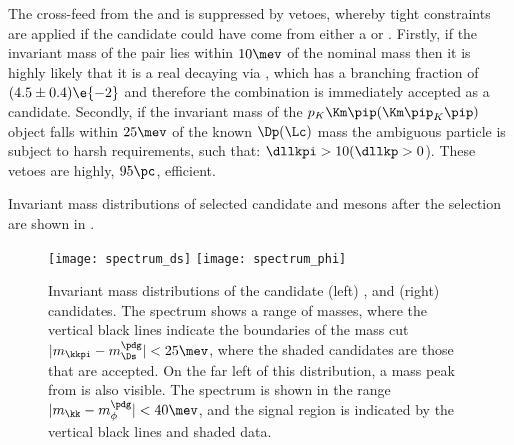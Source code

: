 The cross-feed from the \Dp and \Lc is suppressed by vetoes, whereby tight \pid constraints are
applied if the \dstokkpi candidate could have come from either a \Dp or \Lc.
Firstly, if the invariant mass of the \kk pair lies within $10\mev$ of the nominal \phii mass
then it is highly likely that it is a real \Ds decaying via \decay{\Ds}{\phi\pip}, which has a
branching fraction of $(4.5\pm0.4)\e{-2}$ and therefore the \kkpi combination is immediately
accepted as a \Ds candidate.
Secondly, if the invariant mass of the $p_K\Km\pip(\Km\pip_K\pip)$ object falls within $25\mev$ of
the known $\Dp(\Lc)$ mass the ambiguous particle is subject to harsh \pid requirements, such that:
$\dllkpi>10(\dllkp>0$).
These vetoes are highly, \approx$95\pc$, efficient.






Invariant mass distributions of
selected candidate \Ds and \phii mesons after the selection are shown in .

\begin{figure}
  \begin{center}
    \texttt{[image: spectrum\_ds]}
    \texttt{[image: spectrum\_phi]}
    \caption[Selected \Ds and \phii candidates]
    {
      Invariant mass distributions of the candidate
      (left) \decay{\Ds}{\kkpi}, and
      (right) \decay{\phii}{\kk} candidates.
      The \kkpi spectrum shows a range of masses, where the vertical black lines indicate the
      boundaries of the mass cut $|m_{\kkpi}-m_{\Ds}^\pdg|<25\mev$, where the shaded candidates are
      those that are accepted.
      On the far left of this distribution, a mass peak from \decay{\Dp}{\kkpi} is also visible.
      The \decay{\phi}{\kk} spectrum is shown in the range $|m_{\kk}-m_{\phi}^\pdg|<40\mev$,
      and the signal region is indicated by the vertical black lines and shaded data.
    }
    \label{fig:dsphi:mesons}
  \end{center}
\end{figure}

